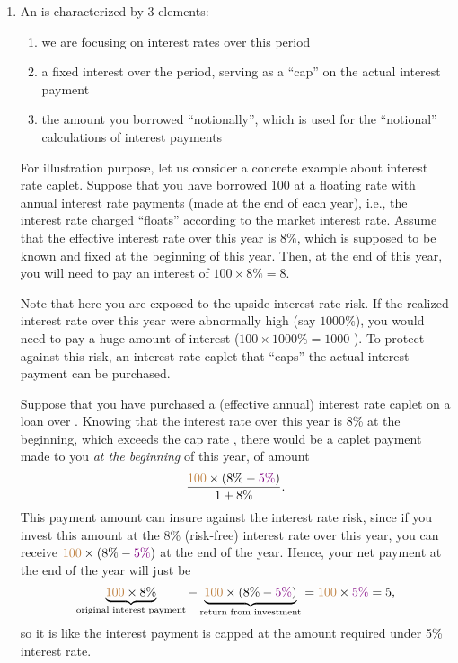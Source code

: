 \begin{enumerate}
\item An  is characterized by 3 elements:
\begin{enumerate}[label={(\arabic*)}]
\item {} we are focusing on interest rates over this period
\item {} a fixed interest over the period, serving as a ``cap'' on the actual interest payment
\item {} the amount you borrowed ``notionally'', which is
used for the ``notional'' calculations of interest payments
\end{enumerate}
For illustration purpose, let us consider a concrete example about interest
rate caplet. Suppose that you have borrowed 100 at a floating rate with annual
interest rate payments (made at the end of each year), i.e., the interest rate
charged ``floats'' according to the market interest rate. Assume that the
effective interest rate over this year is \(8\%\), which is supposed to be
known and fixed at the beginning of this year. Then, at the end of this year,
you will need to pay an interest of \(100\times 8\%=8\).

Note that here you are exposed to the upside interest rate risk. If the
realized interest rate over this year were abnormally high (say \(1000\%\)),
you would need to pay a huge amount of interest (\(100\times 1000\%=1000\)
\warn{}).  To protect against this risk, an interest rate caplet that ``caps''
the actual interest payment can be purchased.

Suppose that you have purchased a  (effective annual) interest rate
caplet on a  loan over . Knowing that the interest rate
over this year is 8\% at the beginning, which exceeds the cap rate ,
there would be a caplet payment made to you \emph{at the beginning} of this
year, of amount
\[
\frac{{\color{brown}100}\times (8\%-{\color{violet}5\%})}{1+8\%}.
\]
This payment amount can insure against the interest rate risk, since if you
invest this amount at the 8\% (risk-free) interest rate over this year, you can
receive \({\color{brown}100}\times (8\%-{\color{violet}5\%})\) at the end of the year. Hence, your
net payment at the end of the year will just be
\[
\underbrace{{\color{brown}100}\times 8\%}_{\text{original interest payment}}-\underbrace{{\color{brown}100}\times
(8\%-{\color{violet}5\%})}_{\text{return from investment}}
={\color{brown}100}\times {\color{violet}5\%}=5,
\]
so it is like the interest payment is capped at the amount required under 5\%
interest rate.


\end{enumerate}
